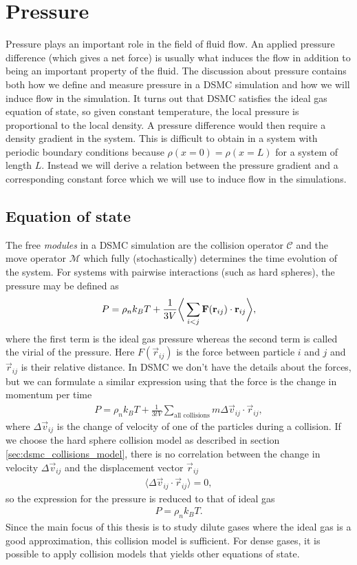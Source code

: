 \section{Pressure}
\label{sec:dsmc_pressure}
Pressure plays an important role in the field of fluid flow. An applied pressure difference (which gives a net force) is usually what induces the flow in addition to being an important property of the fluid. The discussion about pressure contains both how we define and measure pressure in a DSMC simulation and how we will induce flow in the simulation. It turns out that DSMC satisfies the ideal gas equation of state, so given constant temperature, the local pressure is proportional to the local density. A pressure difference would then require a density gradient in the system. This is difficult to obtain in a system with periodic boundary conditions because $\rho(x=0) = \rho(x=L)$ for a system of length $L$. Instead we will derive a relation between the pressure gradient and a corresponding constant force which we will use to induce flow in the simulations.
\subsection{Equation of state}
\label{sec:dsmc_eos}
The free \textit{modules} in a DSMC simulation are the collision operator $\mathcal C$ and the move operator $\mathcal M$ which fully (stochastically) determines the time evolution of the system. For systems with pairwise interactions (such as hard spheres), the pressure may be defined as\cite{frenkel2001understanding}
\begin{align}
	P = \rho_nk_BT + {1\over 3V}\bigg\langle \sum_{i<j} \vec F(\vec r_{ij})\cdot \vec r_{ij}\bigg\rangle,
\end{align}
where the first term is the ideal gas pressure whereas the second term is called the virial of the pressure. Here $F(\vec r_{ij})$ is the force between particle $i$ and $j$ and $\vec r_{ij}$ is their relative distance. In DSMC we don't have the details about the forces, but we can formulate a similar expression using that the force is the change in momentum per time
\begin{align}
	P = \rho_nk_BT + \frac{1}{3tV}\sum_\text{all collisions} m\Delta \vec v_{ij}\cdot \vec r_{ij},
\end{align}
where $\Delta \vec v_{ij}$ is the change of velocity of one of the particles during a collision\cite{garcia1997direct}. If we choose the hard sphere collision model as described in section \ref{sec:dsmc_collisions_model}, there is no correlation between the change in velocity $\Delta \vec v_{ij}$ and the displacement vector $\vec r_{ij}$
\begin{align}
	\langle \Delta \vec v_{ij}\cdot \vec r_{ij}\rangle = 0,
\end{align}
so the expression for the pressure is reduced to that of ideal gas
\begin{align}
	P = \rho_n k_BT.
\end{align}
Since the main focus of this thesis is to study dilute gases where the ideal gas is a good approximation, this collision model is sufficient. For dense gases, it is possible to apply collision models that yields other equations of state.
